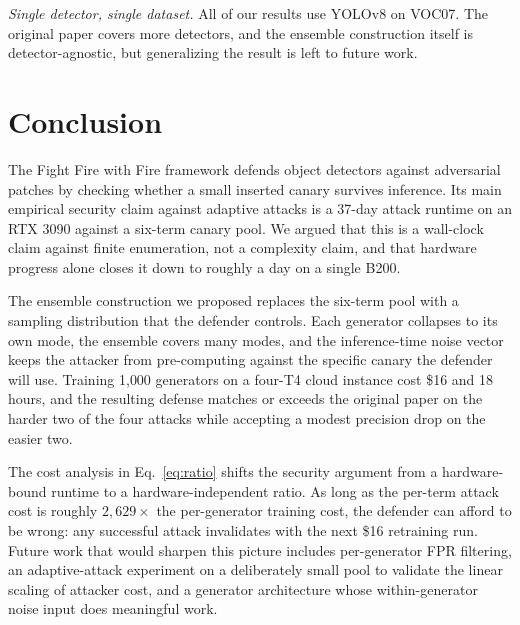 \documentclass[conference]{IEEEtran}
\begin{document}
\textit{Single detector, single dataset.} All of our results use YOLOv8
on VOC07. The original paper covers more detectors, and the ensemble
construction itself is detector-agnostic, but generalizing the result
is left to future work.

\section{Conclusion}
\label{sec:conclusion}

The Fight Fire with Fire framework defends object detectors against
adversarial patches by checking whether a small inserted canary survives
inference. Its main empirical security claim against adaptive attacks is
a 37-day attack runtime on an RTX 3090 against a six-term canary pool.
We argued that this is a wall-clock claim against finite enumeration,
not a complexity claim, and that hardware progress alone closes it down
to roughly a day on a single B200.

The ensemble construction we proposed replaces the six-term pool with a
sampling distribution that the defender controls. Each generator
collapses to its own mode, the ensemble covers many modes, and the
inference-time noise vector keeps the attacker from pre-computing
against the specific canary the defender will use. Training 1{,}000
generators on a four-T4 cloud instance cost \$16 and 18 hours, and the
resulting defense matches or exceeds the original paper on the harder
two of the four attacks while accepting a modest precision drop on the
easier two.

The cost analysis in Eq.~\eqref{eq:ratio} shifts the security argument
from a hardware-bound runtime to a hardware-independent ratio. As long
as the per-term attack cost is roughly $2{,}629\times$ the per-generator
training cost, the defender can afford to be wrong: any successful
attack invalidates with the next \$16 retraining run. Future work that
would sharpen this picture includes per-generator FPR filtering, an
adaptive-attack experiment on a deliberately small pool to validate the
linear scaling of attacker cost, and a generator architecture whose
within-generator noise input does meaningful work.
\end{document}
